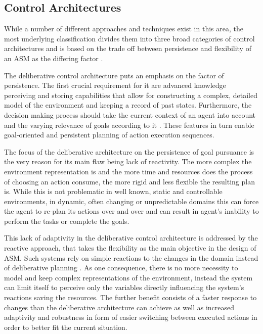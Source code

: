 \subsection{Control Architectures}
While a number of different approaches and techniques exist in this area, the most underlying classification divides them into three broad categories of control architectures and is based on the trade off between persistence and flexibility of an ASM as the differing factor \cite{attractors}.\par
The deliberative control architecture puts an emphasis on the factor of persistence. The first crucial requirement for it are advanced knowledge perceiving and storing capabilities that allow for constructing a complex, detailed model of the environment and keeping a record of past states. Furthermore, the decision making process should take the current context of an agent into account and the varying relevance of goals according to it \cite{goal-directed-decision-making}. These features in turn enable goal-oriented and persistent planning of action execution sequences. \par
The focus of the deliberative architecture on the persistence of goal pursuance is the very reason for its main flaw being lack of reactivity. The more complex the environment representation is and the more time and resources does the process of choosing an action consume, the more rigid and less flexible the resulting plan is.
While this is not problematic in well known, static and controllable environments, in dynamic, often changing or unpredictable domains this can force the agent to re-plan its actions over and over and can result in agent's inability to perform the tasks or complete the goals.\par
This lack of adaptivity in the deliberative control architecture is addressed by the reactive approach, that takes the flexibility as the main objective in the design of ASM. Such systems rely on simple reactions to the changes in the domain instead of deliberative planning \cite{attractors}. As one consequence, there is no more necessity to model and keep complex representations of the environment, instead the system can limit itself to perceive only the variables directly influencing the system's reactions saving the resources. The further benefit consists of a faster response to changes than the deliberative architecture can achieve as well as increased adaptivity and robustness in form of easier switching between executed actions in order to better fit the current situation.\par
